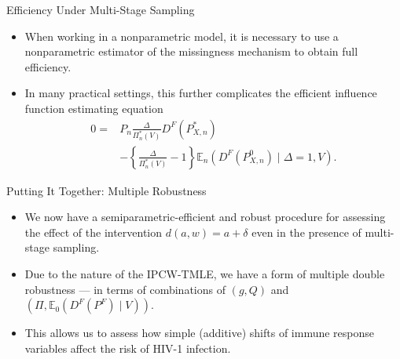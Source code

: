 \documentclass[12pt,t]{beamer}
\newcommand{\E}{\mathbb{E}}
\begin{document}

\begin{frame}[c]{Efficiency Under Multi-Stage Sampling}

\begin{center}
\begin{itemize}
  \itemsep10pt
  \item When working in a nonparametric model, it is necessary to use a
    nonparametric estimator of the missingness mechanism to obtain full
    efficiency.
  \item In many practical settings, this further complicates the efficient
    influence function estimating equation
    \[
      \begin{aligned}
      0 =& P_n \frac{\Delta}{\Pi_n^*(V)}D^F(P^*_{X,n}) \\
      &- \left\{\frac{\Delta}{\Pi_n^*(V)} - 1 \right\} \E_n(D^F(P^0_{X,n}) \mid
      \Delta = 1, V).
     \end{aligned}
    \]
\end{itemize}
\end{center}

\note{
}

\end{frame}


\begin{frame}[c]{Putting It Together: Multiple Robustness}

\begin{center}
\begin{itemize}
  \itemsep10pt
  \item We now have a semiparametric-efficient and robust procedure for
    assessing the effect of the intervention $d(a,w) = a + \delta$ even in the
    presence of multi-stage sampling.
  \item Due to the nature of the IPCW-TMLE, we have a form of multiple double
    robustness --- in terms of combinations of $(g, Q)$ and
    $(\Pi, \E_0(D^F(P^F) \mid V))$.
  \item This allows us to assess how simple (additive) shifts of immune response
    variables affect the risk of HIV-1 infection.
\end{itemize}
\end{center}

\note{
}

\end{frame}
\end{document}
